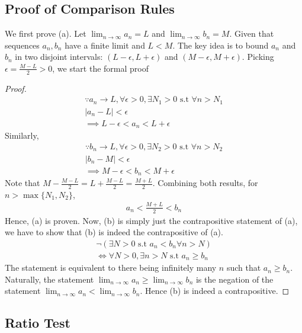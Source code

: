 \documentclass[12pt]{book}
\theoremstyle{definition}
\begin{document}
\subsection{Proof of Comparison Rules}
We first prove (a). Let $\lim_{n \to \infty} a_n = L$ and $\lim_{n \to \infty} b_n = M$. Given that sequences $a_n, b_n$ have a finite limit and $L<M$. The key idea is to bound $a_n$ and $b_n$ in two disjoint intervals: $(L-\epsilon, L + \epsilon)$ and $(M-\epsilon, M+\epsilon)$. Picking $\epsilon = \frac{M-L}{2} >0$, we start the formal proof
\begin{proof}
\begin{gather*}
		\because a_n \to L, \forall \epsilon >0, \exists N_1>0 \text{ s.t } \forall n > N_1\\
		|a_n-L| < \epsilon\\
		\implies L- \epsilon <a_n<L+\epsilon
\end{gather*}
Similarly,
\begin{gather*}
	\because b_n \to L, \forall \epsilon >0, \exists N_2>0 \text{ s.t } \forall n > N_2\\
	|b_n-M| <\epsilon\\
	\implies M -\epsilon<b_n<M+\epsilon
\end{gather*}
Note that $M-\frac{M-L}{2}=L+\frac{M-L}{2} = \frac{M+L}{2}$. Combining both results, for $n > \max\{N_1,N_2\}$,
\begin{align*}
a_n < 	\frac{M+L}{2} < b_n
\end{align*}
Hence, (a) is proven. Now, (b) is simply just the contrapositive statement of (a), we have to show that (b) is indeed the contrapositive of (a). 
\begin{gather*}
\neg(\exists N>0 \text{ s.t } a_n < b_n  \forall n>N)\\
\iff \forall N>0, \exists n >N \text{ s.t } a_n \geq b_n
\end{gather*}
The statement is equivalent to there being infinitely many $n$ such that $a_n\geq b_n$. Naturally, the statement $\lim_{n \to \infty}a_n \geq \lim_{n \to \infty}b_n$ is the negation of the statement $\lim_{n \to \infty} a_n < \lim_{n \to \infty} b_n $. Hence (b) is indeed a contrapositive.

\end{proof}

\subsection{Ratio Test}
\end{document}
